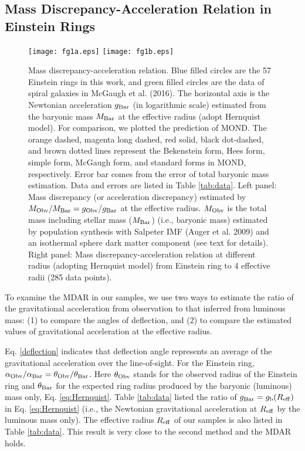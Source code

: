 \documentclass[fleqn,usenatbib,useAMS]{mnras}
\begin{document}
        \subsection{Mass Discrepancy-Acceleration Relation in Einstein Rings}

        \begin{figure*}
            \texttt{[image: fg1a.eps]}
            \texttt{[image: fg1b.eps]}
            \caption{Mass discrepancy-acceleration relation. Blue filled circles are the 57 Einstein rings in this work, and green filled circles are the data of spiral galaxies in
            McGaugh et al. (2016). The horizontal axis is the Newtonian acceleration $g_{\rm Bar}$ (in logarithmic scale) estimated from the baryonic mass $M_{\rm Bar}$ at the effective radius (adopt Hernquist model). For comparison, we plotted the prediction of MOND. The orange dashed, magenta long dashed, red solid, black dot-dashed, and brown dotted lines represent the Bekenstein form, Hees form, simple form, McGaugh form, and standard forms in MOND, respectively. Error bar comes from the error of total baryonic mass estimation. Data and errors are listed in Table \ref{tab:data}. Left panel: Mass discrepancy (or acceleration discrepancy) estimated by $M_{\rm Obv}/M_{\rm Bar}=g_{\rm Obv}/g_{\rm Bar}$ at the effective radius. $M_{\rm Obv}$ is the total mass including stellar mass ($M_{\rm Bar}$) (i.e., baryonic mass) estimated by population synthesis with Salpeter IMF (Auger et al. 2009) and an isothermal sphere dark matter component (see text for details). Right panel: Mass discrepancy-acceleration relation at different radius (adopting Hernquist model) from Einstein ring to 4 effective radii (285 data points).}\label{fig:MassDis}
        \end{figure*}

    To examine the MDAR in our samples, we use two ways to estimate the ratio of the gravitational acceleration from observation to that inferred from luminous mass:
    (1) to compare the angles of deflection, and
    (2) to compare the estimated values of gravitational acceleration at the effective radius.

    Eq. \ref{deflection} indicates that deflection angle represents an average of the gravitational acceleration over the line-of-sight.
    For the Einstein ring, $\alpha_{\rm Obv}/\alpha_{\rm Bar}=\theta_{\rm Obv}/\theta_{\rm Bar}$.
    Here $\theta_{\rm Obv}$ stands for the observed radius of the Einstein ring and $\theta_{\rm Bar}$ for the expected ring radius produced by the baryonic (luminous) mass only, Eq. \ref{eq:Hernquist}.
    Table \ref{tab:data} listed the ratio of $g_{\rm Bar}=g_{\rm b}(R_{\rm eff})$ in Eq. \ref{eq:Hernquist}  (i.e., the Newtonian gravitational acceleration at $R_{\rm eff}$ by the luminous mass only).
    The effective radius $R_{\rm eff}$ of our samples is also listed in Table \ref{tab:data}.
    This result is very close to the second method and the MDAR holds.
\end{document}
